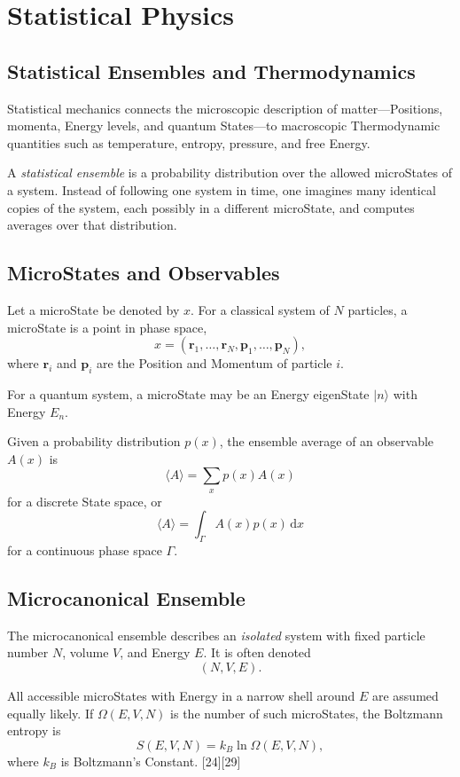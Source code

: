 \documentclass[a4paper, 10pt, onepage]{elegantbook}
\begin{document}
{\newpage

\chapter{Statistical Physics}


\section{Statistical Ensembles and Thermodynamics}

Statistical mechanics connects the microscopic description of matter---Positions,
momenta, Energy levels, and quantum States---to macroscopic Thermodynamic
quantities such as temperature, entropy, pressure, and free Energy.

A \emph{statistical ensemble} is a probability distribution over the allowed
microStates of a system. Instead of following one system in time, one imagines
many identical copies of the system, each possibly in a different microState,
and computes averages over that distribution.

\section{MicroStates and Observables}

Let a microState be denoted by \(x\). For a classical system of \(N\) particles,
a microState is a point in phase space,
\[
x=(\mathbf r_1,\ldots,\mathbf r_N,\mathbf p_1,\ldots,\mathbf p_N),
\]
where \(\mathbf r_i\) and \(\mathbf p_i\) are the Position and Momentum of
particle \(i\).

For a quantum system, a microState may be an Energy eigenState \(|n\rangle\)
with Energy \(E_n\).

Given a probability distribution \(p(x)\), the ensemble average of an observable
\(A(x)\) is
\[
\langle A\rangle
=
\sum_x p(x)A(x)
\]
for a discrete State space, or
\[
\langle A\rangle
=
\int_{\Gamma} A(x)p(x)\,\mathrm dx
\]
for a continuous phase space \(\Gamma\).

\section{Microcanonical Ensemble}

The microcanonical ensemble describes an \emph{isolated} system with fixed
particle number \(N\), volume \(V\), and Energy \(E\). It is often denoted
\[
(N,V,E).
\]

All accessible microStates with Energy in a narrow shell around \(E\) are assumed
equally likely. If \(\Omega(E,V,N)\) is the number of such microStates, the
Boltzmann entropy is
\[
S(E,V,N)
=
k_B\ln \Omega(E,V,N),
\]
where \(k_B\) is Boltzmann's Constant. [24][29]

}
\end{document}

